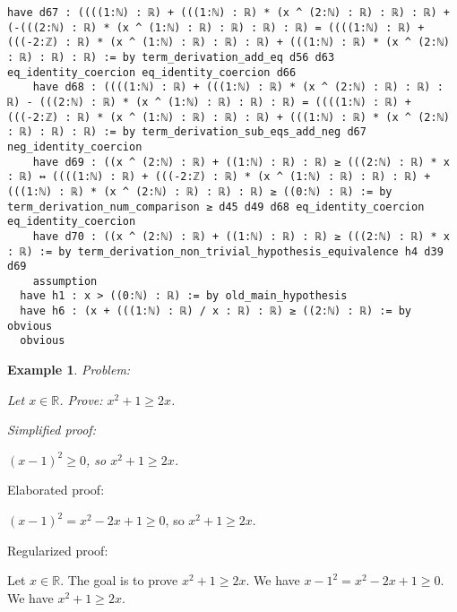 \documentclass{article}
\newtheorem{example}{Example}
\begin{document}
\begin{tcolorbox}[colback=white!10, width=\linewidth]
\begin{lstlisting}[language=Lean4]
    have d67 : ((((1:ℕ) : ℝ) + (((1:ℕ) : ℝ) * (x ^ (2:ℕ) : ℝ) : ℝ) : ℝ) + (-(((2:ℕ) : ℝ) * (x ^ (1:ℕ) : ℝ) : ℝ) : ℝ) : ℝ) = ((((1:ℕ) : ℝ) + (((-2:ℤ) : ℝ) * (x ^ (1:ℕ) : ℝ) : ℝ) : ℝ) + (((1:ℕ) : ℝ) * (x ^ (2:ℕ) : ℝ) : ℝ) : ℝ) := by term_derivation_add_eq d56 d63 eq_identity_coercion eq_identity_coercion d66
    have d68 : ((((1:ℕ) : ℝ) + (((1:ℕ) : ℝ) * (x ^ (2:ℕ) : ℝ) : ℝ) : ℝ) - (((2:ℕ) : ℝ) * (x ^ (1:ℕ) : ℝ) : ℝ) : ℝ) = ((((1:ℕ) : ℝ) + (((-2:ℤ) : ℝ) * (x ^ (1:ℕ) : ℝ) : ℝ) : ℝ) + (((1:ℕ) : ℝ) * (x ^ (2:ℕ) : ℝ) : ℝ) : ℝ) := by term_derivation_sub_eqs_add_neg d67 neg_identity_coercion
    have d69 : ((x ^ (2:ℕ) : ℝ) + ((1:ℕ) : ℝ) : ℝ) ≥ (((2:ℕ) : ℝ) * x : ℝ) ↔ ((((1:ℕ) : ℝ) + (((-2:ℤ) : ℝ) * (x ^ (1:ℕ) : ℝ) : ℝ) : ℝ) + (((1:ℕ) : ℝ) * (x ^ (2:ℕ) : ℝ) : ℝ) : ℝ) ≥ ((0:ℕ) : ℝ) := by term_derivation_num_comparison ≥ d45 d49 d68 eq_identity_coercion eq_identity_coercion
    have d70 : ((x ^ (2:ℕ) : ℝ) + ((1:ℕ) : ℝ) : ℝ) ≥ (((2:ℕ) : ℝ) * x : ℝ) := by term_derivation_non_trivial_hypothesis_equivalence h4 d39 d69
    assumption
  have h1 : x > ((0:ℕ) : ℝ) := by old_main_hypothesis
  have h6 : (x + (((1:ℕ) : ℝ) / x : ℝ) : ℝ) ≥ ((2:ℕ) : ℝ) := by obvious
  obvious

\end{lstlisting}
\end{tcolorbox}


\begin{example}
Problem:
\begin{tcolorbox}[colback=yellow!10, width=\linewidth]
Let $x\in\mathbb{R}$. Prove: $x^2 + 1\ge 2x$.
\end{tcolorbox}

Simplified proof:
\begin{tcolorbox}[colback=blue!10, width=\linewidth]
$(x-1)^2 \ge 0$, so $x^2 + 1 \ge 2x$.
\end{tcolorbox}
\end{example}

Elaborated proof:
\begin{tcolorbox}[colback=green!10, width=\linewidth]
$(x-1)^2 = x^2 - 2x + 1 \ge 0$, so $x^2 + 1 \ge 2x$.
\end{tcolorbox}

Regularized proof:
\begin{tcolorbox}[colback=red!10, width=\linewidth]
Let $x\in\mathbb{R}$.
The goal is to prove $x^2 + 1 \ge 2x$.
We have ${{x-1}}^2 = x^2 - 2x + 1 \ge 0$.
We have $x^2 + 1 \ge 2x$.
\end{tcolorbox}
\end{document}
